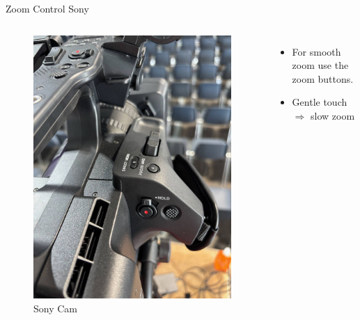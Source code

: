 \begin{frame}{Zoom Control Sony}
	\begin{columns}[T,onlytextwidth]
	\begin{figure}
		\centering
		\includegraphics[width=0.99\textwidth]{images/sony-zoom.jpg}
		\caption{Sony Cam}
	\end{figure}
		\begin{itemize}
			\item For smooth zoom use the zoom buttons.
			\item Gentle touch $\Rightarrow$ slow zoom
		\end{itemize}
	\end{columns}
\end{frame}
